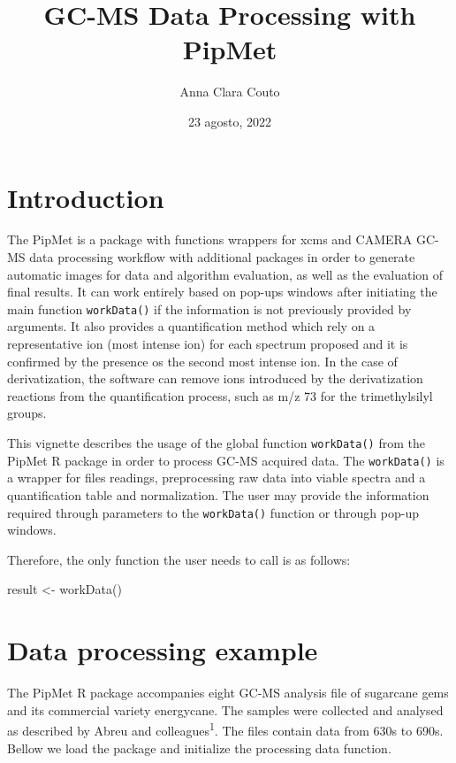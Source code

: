 \documentclass[
]{article}
\title{GC-MS Data Processing with PipMet}
\author{Anna Clara Couto}
\date{23 agosto, 2022}
\newenvironment{Shaded}{\begin{snugshade}}{\end{snugshade}}
\newcommand{\FunctionTok}[1]{\textcolor[rgb]{0.00,0.00,0.00}{#1}}
\newcommand{\NormalTok}[1]{#1}
\newcommand{\OtherTok}[1]{\textcolor[rgb]{0.56,0.35,0.01}{#1}}
\begin{document}
\maketitle

{
\setcounter{tocdepth}{2}
\tableofcontents
}
\hypertarget{introduction}{%
\section{Introduction}\label{introduction}}

The PipMet is a package with functions wrappers for xcms and CAMERA
GC-MS data processing workflow with additional packages in order to
generate automatic images for data and algorithm evaluation, as well as
the evaluation of final results. It can work entirely based on pop-ups
windows after initiating the main function \texttt{workData()} if the
information is not previously provided by arguments. It also provides a
quantification method which rely on a representative ion (most intense
ion) for each spectrum proposed and it is confirmed by the presence os
the second most intense ion. In the case of derivatization, the software
can remove ions introduced by the derivatization reactions from the
quantification process, such as m/z 73 for the trimethylsilyl groups.

This vignette describes the usage of the global function
\texttt{workData()} from the PipMet R package in order to process GC-MS
acquired data. The \texttt{workData()} is a wrapper for files readings,
preprocessing raw data into viable spectra and a quantification table
and normalization. The user may provide the information required through
parameters to the \texttt{workData()} function or through pop-up
windows.

Therefore, the only function the user needs to call is as follows:

\begin{Shaded}
\begin{Highlighting}[]
\NormalTok{result }\OtherTok{\textless{}{-}} \FunctionTok{workData}\NormalTok{()}
\end{Highlighting}
\end{Shaded}

\hypertarget{data-processing-example}{%
\section{Data processing example}\label{data-processing-example}}

The PipMet R package accompanies eight GC-MS analysis file of sugarcane
gems and its commercial variety energycane. The samples were collected
and analysed as described by Abreu and colleagues\textsuperscript{1}.
The files contain data from 630s to 690s. Bellow we load the package and
initialize the processing data function.
\end{document}
